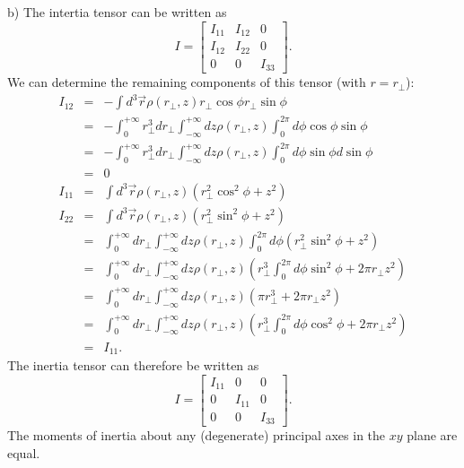 \documentclass[letterpaper,11pt]{article}
\begin{document}
b) The intertia tensor can be written as
\begin{equation*}
 I = \left[ \begin{array}{ccc}
  I_{11} & I_{12} & 0 \\
  I_{12} & I_{22} & 0 \\
  0 & 0 & I_{33}
 \end{array} \right].
\end{equation*}
We can determine the remaining components of this tensor (with $r = r_\perp$):
\begin{eqnarray*}
 I_{12} & = & - \int d^3\vec{r} \rho(r_\perp,z) r_\perp \cos\phi r_\perp \sin\phi \\
 & = & - \int_0^{+\infty} r_\perp^3 dr_\perp \int_{-\infty}^{+\infty} dz \rho(r_\perp,z) \int_0^{2\pi} d\phi \cos\phi \sin\phi \\
 & = & - \int_0^{+\infty} r_\perp^3 dr_\perp \int_{-\infty}^{+\infty} dz \rho(r_\perp,z) \int_0^{2\pi} d\phi \sin\phi d \sin\phi \\
 & = & 0 \\
 I_{11} & = & \int d^3\vec{r} \rho(r_\perp,z) (r_\perp^2 \cos^2\phi + z^2) \\
 I_{22} & = & \int d^3\vec{r} \rho(r_\perp,z) (r_\perp^2 \sin^2\phi + z^2) \\
 & = & \int_0^{+\infty} dr_\perp \int_{-\infty}^{+\infty} dz \rho(r_\perp,z) \int_0^{2\pi} d\phi (r_\perp^2 \sin^2\phi + z^2) \\
 & = & \int_0^{+\infty} dr_\perp \int_{-\infty}^{+\infty} dz \rho(r_\perp,z) \left( r_\perp^3 \int_0^{2\pi} d\phi \sin^2\phi + 2 \pi r_\perp z^2 \right) \\
 & = & \int_0^{+\infty} dr_\perp \int_{-\infty}^{+\infty} dz \rho(r_\perp,z) \left( \pi r_\perp^3 + 2 \pi r_\perp z^2 \right) \\
 & = & \int_0^{+\infty} dr_\perp \int_{-\infty}^{+\infty} dz \rho(r_\perp,z) \left( r_\perp^3 \int_0^{2\pi} d\phi \cos^2\phi + 2 \pi r_\perp z^2 \right) \\
 & = & I_{11}.
\end{eqnarray*}
The inertia tensor can therefore be written as
\begin{equation*}
 I = \left[ \begin{array}{ccc}
  I_{11} & 0 & 0 \\
  0 & I_{11} & 0 \\
  0 & 0 & I_{33}
 \end{array} \right].
\end{equation*}
The moments of inertia about any (degenerate) principal axes in the $xy$ plane are equal.
\end{document}
